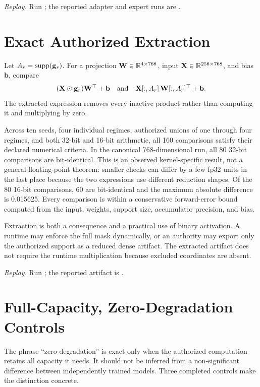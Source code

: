 \documentclass[11pt]{article}
\begin{document}
\noindent\textit{Replay.} Run
; the reported adapter and
expert runs are .

\section{Exact Authorized Extraction}

Let $A_r=\operatorname{supp}(\mathbf{g}_r)$. For a projection $\mathbf{W}\in\mathbb{R}^{4\times768}$,
input $\mathbf X\in\mathbb{R}^{256\times768}$, and bias $\mathbf b$, compare
\begin{equation}
  (\mathbf X\odot\mathbf{g}_r)\mathbf{W}^\top+\mathbf b
  \quad\text{and}\quad
  \mathbf X[:,A_r]\,\mathbf{W}[:,A_r]^\top+\mathbf b.
\end{equation}
The extracted expression removes every inactive product rather than computing
it and multiplying by zero.

Across ten seeds, four individual regimes, authorized unions of one through
four regimes, and both 32-bit and 16-bit arithmetic, all 160 comparisons satisfy
their declared numerical criteria. In the canonical 768-dimensional run, all
80 32-bit comparisons are bit-identical. This is an observed kernel-specific
result, not a general floating-point theorem: smaller checks can differ by a
few fp32 units in the last place because the two expressions use different
reduction shapes. Of the 80 16-bit comparisons, 60 are bit-identical and the
maximum absolute difference is 0.015625. Every comparison is within a
conservative forward-error bound computed from the input, weights, support
size, accumulator precision, and bias.

Extraction is both a consequence and a practical use of binary activation. A
runtime may enforce the full mask dynamically, or an authority may export only
the authorized support as a reduced dense artifact. The extracted artifact does
not require the runtime multiplication because excluded coordinates are absent.

\noindent\textit{Replay.} Run ; the
reported artifact is
.

\section{Full-Capacity, Zero-Degradation Controls}

The phrase ``zero degradation'' is exact only when the authorized computation
retains all capacity it needs. It should not be inferred from a non-significant
difference between independently trained models. Three completed controls make
the distinction concrete.
\end{document}
